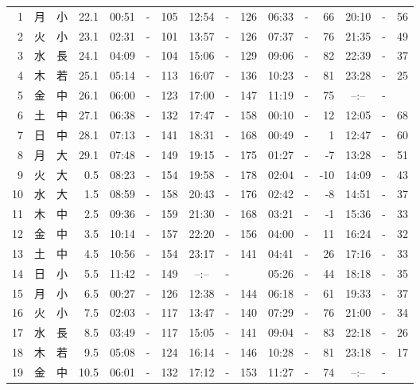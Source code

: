 \documentclass[12pt.a4j]{jsarticle}
\begin{document}
\begin{center}
\begin{table}[ht]
\begin{tabular}{|rc|cr|ccrccr|ccrccr|}
 \hline
 1 & 月 & 小 & 22.1 &  00:51 &-& 105  &  12:54 &-& 126  &   06:33 &-&  66  &   20:10 &-&  56  \\
 2 & 火 & 小 & 23.1 &  02:31 &-& 101  &  13:57 &-& 126  &   07:37 &-&  76  &   21:35 &-&  49  \\
 3 & 水 & 長 & 24.1 &  04:09 &-& 104  &  15:06 &-& 129  &   09:06 &-&  82  &   22:39 &-&  37  \\
 4 & 木 & 若 & 25.1 &  05:14 &-& 113  &  16:07 &-& 136  &   10:23 &-&  81  &   23:28 &-&  25  \\
 5 & 金 & 中 & 26.1 &  06:00 &-& 123  &  17:00 &-& 147  &   11:19 &-&  75  &   --:-- &-&     \\
 6 & 土 & 中 & 27.1 &  06:38 &-& 132  &  17:47 &-& 158  &   00:10 &-&  12  &   12:05 &-&  68  \\
 7 & 日 & 中 & 28.1 &  07:13 &-& 141  &  18:31 &-& 168  &   00:49 &-&   1  &   12:47 &-&  60  \\
 8 & 月 & 大 & 29.1 &  07:48 &-& 149  &  19:15 &-& 175  &   01:27 &-&  -7  &   13:28 &-&  51  \\
 9 & 火 & 大 &  0.5 &  08:23 &-& 154  &  19:58 &-& 178  &   02:04 &-& -10  &   14:09 &-&  43  \\
10 & 水 & 大 &  1.5 &  08:59 &-& 158  &  20:43 &-& 176  &   02:42 &-&  -8  &   14:51 &-&  37  \\
11 & 木 & 中 &  2.5 &  09:36 &-& 159  &  21:30 &-& 168  &   03:21 &-&  -1  &   15:36 &-&  33  \\
12 & 金 & 中 &  3.5 &  10:14 &-& 157  &  22:20 &-& 156  &   04:00 &-&  11  &   16:24 &-&  32  \\
13 & 土 & 中 &  4.5 &  10:56 &-& 154  &  23:17 &-& 141  &   04:41 &-&  26  &   17:16 &-&  33  \\
14 & 日 & 小 &  5.5 &  11:42 &-& 149  &  --:-- &-&     &   05:26 &-&  44  &   18:18 &-&  35  \\
15 & 月 & 小 &  6.5 &  00:27 &-& 126  &  12:38 &-& 144  &   06:18 &-&  61  &   19:33 &-&  37  \\
16 & 火 & 小 &  7.5 &  02:03 &-& 117  &  13:47 &-& 140  &   07:29 &-&  76  &   21:00 &-&  34  \\
17 & 水 & 長 &  8.5 &  03:49 &-& 117  &  15:05 &-& 141  &   09:04 &-&  83  &   22:18 &-&  26  \\
18 & 木 & 若 &  9.5 &  05:08 &-& 124  &  16:14 &-& 146  &   10:28 &-&  81  &   23:18 &-&  17  \\
19 & 金 & 中 & 10.5 &  06:01 &-& 132  &  17:12 &-& 153  &   11:27 &-&  74  &   --:-- &-&     \\

\end{tabular}
\end{table}
\end{center}
\end{document}
